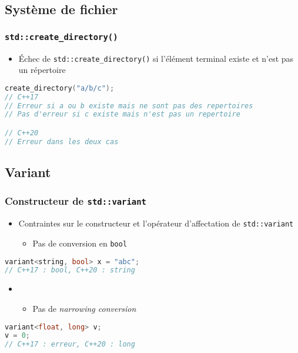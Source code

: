 \documentclass[C++.tex]{subfiles}
\begin{document}
\subsection*{Système de fichier}
\begin{frame}[fragile]
	\frametitle{\lstinline|std::create_directory()|}
	\begin{itemize}
		\item Échec de \lstinline|std::create_directory()| si l'élément terminal existe et n'est pas un répertoire
	\end{itemize}

	\begin{lstlisting}[language=C++]
create_directory("a/b/c");
// C++17
// Erreur si a ou b existe mais ne sont pas des repertoires
// Pas d'erreur si c existe mais n'est pas un repertoire

// C++20
// Erreur dans les deux cas\end{lstlisting}
\end{frame}

\subsection*{Variant}
\begin{frame}[fragile]
	\frametitle{Constructeur de \lstinline|std::variant|}
	\begin{itemize}
		\item Contraintes sur le constructeur et l'opérateur d'affectation de \lstinline|std::variant|
		\begin{itemize}
			\item Pas de conversion en \lstinline|bool|
		\end{itemize}
	\end{itemize}

	\begin{lstlisting}[language=C++]
variant<string, bool> x = "abc";
// C++17 : bool, C++20 : string\end{lstlisting}

	\begin{itemize}
		\item [] \begin{itemize}
			\item Pas de \textit{narrowing conversion}
		\end{itemize}
	\end{itemize}

	\begin{lstlisting}[language=C++]
variant<float, long> v;
v = 0;
// C++17 : erreur, C++20 : long\end{lstlisting}
\end{frame}
\end{document}
